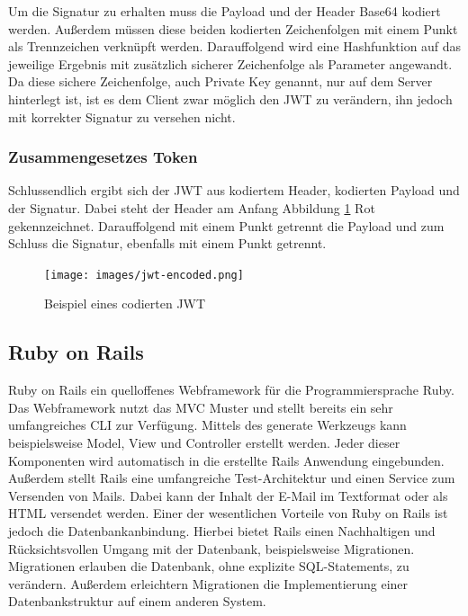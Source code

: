 \documentclass[paper=a4,fontsize=12pt,parskip=half]{scrartcl}
\begin{document}
	Um die Signatur zu erhalten muss die Payload und der Header Base64 kodiert werden. Außerdem müssen diese beiden kodierten Zeichenfolgen mit einem Punkt als Trennzeichen verknüpft werden. Darauffolgend wird eine Hashfunktion auf das jeweilige Ergebnis mit zusätzlich sicherer Zeichenfolge als Parameter angewandt. Da diese sichere Zeichenfolge, auch Private Key genannt, nur auf dem Server hinterlegt ist, ist es dem Client zwar möglich den \gls{JWT} zu verändern, ihn jedoch mit korrekter Signatur zu versehen nicht.

	\subsubsection{Zusammengesetzes Token}
	\label{sec: jwt_result}
	Schlussendlich ergibt sich der \gls{JWT} aus kodiertem Header, kodierten Payload und der Signatur. Dabei steht der Header am Anfang Abbildung \ref{fig:jwt-encoded} Rot gekennzeichnet. Darauffolgend mit einem Punkt getrennt die Payload und zum Schluss die Signatur, ebenfalls mit einem Punkt getrennt.

	\begin{figure}[h]
		\texttt{[image: images/jwt-encoded.png]}
		\caption{Beispiel eines codierten \gls{JWT} }
		\label{fig:jwt-encoded}
	\end{figure}

	\subsection{Ruby on Rails}
	\label{sec: rails}
	Ruby on Rails ein quelloffenes Webframework für die Programmiersprache Ruby. Das Webframework nutzt das \gls{MVC} Muster und stellt bereits ein sehr umfangreiches \gls{CLI} zur Verfügung. Mittels des generate Werkzeugs kann beispielsweise Model, View und Controller erstellt werden. Jeder dieser Komponenten wird automatisch in die erstellte Rails Anwendung eingebunden. Außerdem stellt Rails eine umfangreiche Test-Architektur und einen Service zum Versenden von Mails. Dabei kann der Inhalt der E-Mail im Textformat oder als \gls{HTML} versendet werden. Einer der wesentlichen Vorteile von Ruby on Rails ist jedoch die Datenbankanbindung. Hierbei bietet Rails einen Nachhaltigen und Rücksichtsvollen Umgang mit der Datenbank, beispielsweise Migrationen. Migrationen erlauben die Datenbank, ohne explizite SQL-Statements, zu verändern. Außerdem erleichtern Migrationen die Implementierung einer Datenbankstruktur auf einem anderen System.

\end{document}
